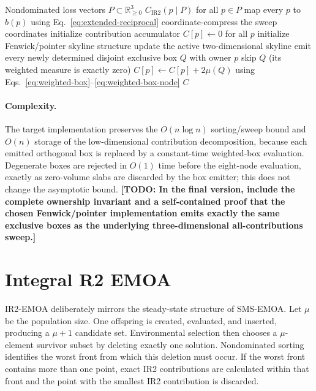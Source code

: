 \documentclass[runningheads]{llncs}
\newcommand{\IR}{\operatorname{IR2}}
\newcommand{\todo}[1]{\textcolor{red!70!black}{\textbf{[TODO: #1]}}}
\newcommand{\R}{\mathbb{R}}
\newcommand{\cIR}{C_{\IR}}
\begin{document}
\begin{algorithm}[t]
\caption{Three-objective all-contribution framework}
\label{alg:all3d}
\begin{algorithmic}[1]
\Require Nondominated loss vectors $P\subset\R^3_{\ge0}$
\Ensure $\cIR(p\mid P)$ for all $p\in P$
\State map every $p$ to $b(p)$ using Eq.~\eqref{eq:extended-reciprocal}
\State coordinate-compress the sweep coordinates
\State initialize contribution accumulator $C[p]\gets0$ for all $p$
\State initialize Fenwick/pointer skyline structure
    \State update the active two-dimensional skyline
    \State emit every newly determined disjoint exclusive box $Q$ with owner $p$
        \State skip $Q$ (its weighted measure is exactly zero)
    \Else
        \State $C[p]\gets C[p]+2\mu(Q)$ using Eqs.~\eqref{eq:weighted-box}--\eqref{eq:weighted-box-node}
    \EndIf
\EndFor
\State \Return $C$
\end{algorithmic}
\end{algorithm}

\paragraph{Complexity.}
The target implementation preserves the $O(n\log n)$ sorting/sweep bound and $O(n)$ storage of the low-dimensional contribution decomposition, because each emitted orthogonal box is replaced by a constant-time weighted-box evaluation. Degenerate boxes are rejected in $O(1)$ time before the eight-node evaluation, exactly as zero-volume slabs are discarded by the box emitter; this does not change the asymptotic bound. \todo{In the final version, include the complete ownership invariant and a self-contained proof that the chosen Fenwick/pointer implementation emits exactly the same exclusive boxes as the underlying three-dimensional all-contributions sweep.}

\section{Integral R2 EMOA}
\label{sec:emoa}

IR2-EMOA deliberately mirrors the steady-state structure of SMS-EMOA. Let $\mu$ be the population size. One offspring is created, evaluated, and inserted, producing a $\mu+1$ candidate set. Environmental selection then chooses a $\mu$-element survivor subset by deleting exactly one solution. Nondominated sorting identifies the worst front from which this deletion must occur. If the worst front contains more than one point, exact IR2 contributions are calculated within that front and the point with the smallest IR2 contribution is discarded.
\end{document}
